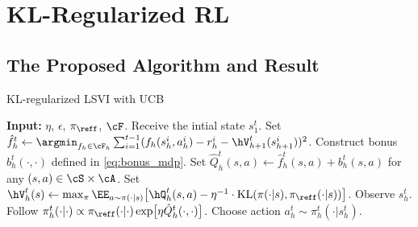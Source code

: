 \documentclass[11pt]{article}
\newcommand{\KL}{\mathrm{KL}}
\begin{document}
\section{KL-Regularized RL}
\subsection{The Proposed Algorithm and Result}

\begin{algorithm}[ht]
    \caption{KL-regularized LSVI with UCB}
    \label{alg:kl-mdp}
    \begin{algorithmic}[1]
    \STATE \textbf{Input:} $\eta$, $\epsilon$, $\pi_{\reff}$, $\cF$.
        \STATE Receive the intial state $s_1^t$.
            \STATE Set $\hat f_h^t \gets \argmin_{f_h \in \cF_h} \sum_{i = 1}^{t - 1} (f_h(s_h^i, a_h^i) - r_h^i - \hV^t_{h + 1}(s_{h + 1}^i))^2$.
            \STATE Construct bonus $b_h^t(\cdot,\cdot)$ defined in \eqref{eq:bonus_mdp}.
            \STATE Set $\hat Q^t_h(s, a) \gets \hat f^t_h(s, a) + b^t_h(s, a)$ for any $(s, a) \in \cS \times \cA$.
            \STATE Set $\hV^t_h(s) \gets \max_{\pi} \EE_{a \sim \pi(\cdot | s)} \bigl[\hQ^t_h(s, a) - \eta^{-1} \cdot \KL(\pi(\cdot | s), \pi_{\reff}(\cdot | s))\bigr]$.
        \ENDFOR          
            \STATE Observe $s_h^t$.
            \STATE Follow $\pi^t_h(\cdot | \cdot) \propto \pi_{\reff}(\cdot | \cdot) \exp\bigl[\eta \hat Q^t_h(\cdot, \cdot)\bigr]$.
            \STATE Choose action $a_h^t \sim \pi^t_h(\cdot | s_h^t)$.
        \ENDFOR
    \ENDFOR
    \end{algorithmic}
\end{algorithm}
\end{document}
